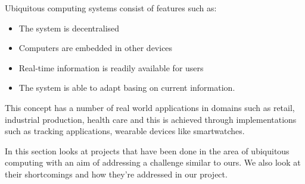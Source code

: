 Ubiquitous computing systems consist of features such as:\cite{friedewald_ubiquitous_2011}
\begin{itemize}
    \item The system is decentralised
    \item Computers are embedded in other devices
    \item Real-time information is readily available for users
    \item The system is able to adapt basing on current information.
\end{itemize}

This concept has a number of real world applications in domains such as retail, industrial production, health care and this is achieved through implementations such as tracking applications, wearable devices like smartwatches.

In this section looks at projects that have been done in the area of ubiquitous computing with an aim of addressing a challenge similar to ours. We also look at their shortcomings and how they're addressed in our project.

